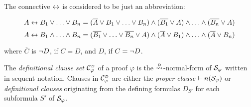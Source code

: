 \begin{remark}
The connective $\leftrightarrow$ is considered to be just an abbreviation:
\begin{small}
$$
A \leftrightarrow B_1 \vee \ldots \vee B_n = 
(\overline{A} \vee B_1 \vee \ldots \vee B_n) \wedge 
(\overline{B_1} \vee A) \wedge \ldots \wedge 
(\overline{B_n} \vee A)
$$
$$
A \leftrightarrow B_1 \wedge \ldots \wedge B_n = 
(\overline{B_1} \vee \ldots \vee \overline{B_n} \vee A ) \wedge 
(\overline{A} \vee B_1) \wedge \ldots \wedge 
(\overline{A} \vee B_n)
$$
\end{small}
where $\overline{C}$ is $\neg D$, if $C = D$, and $D$, if $C = \neg D$.
\end{remark}


\begin{definition}
\label{definition:ClauseSetDefinitional}
The \emph{definitional clause set} $\clausesetDefinitional{\varphi}$ of a 
proof $\varphi$ is the $\normalizePlusTimesD$-normal-form of $\mathcal{S}_{\varphi}$ 
written in sequent notation. Clauses in $\clausesetDefinitional{\varphi}$ are either the \emph{proper clause} $\vdash n(\mathcal{S}_{\varphi})$ or \emph{definitional clauses} originating from the defining formulas $D_{S'}$ for each subformula $S'$ of $\mathcal{S}_{\varphi}$.
\end{definition}

